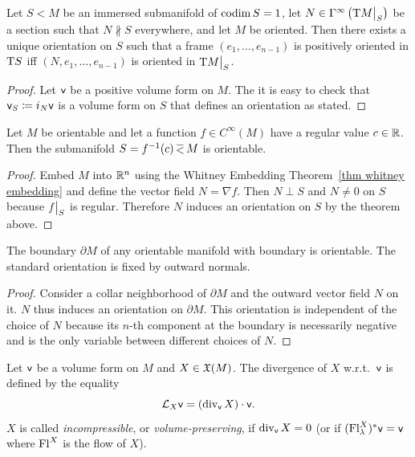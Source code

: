 \begin{thm}\label{thm orientation via normal vector}
    Let $S<M$ be an immersed submanifold of $\operatorname{codim} S=1$, let $N\in\Gamma^\infty\left(\restr{\T M}{S}\right)$ be a section such that $N\not\parallel S$ everywhere, and let $M$ be oriented. Then there exists a unique orientation on $S$ such that a frame $(e_1,\ldots,e_{n-1})$ is positively oriented in $\mathrm{T} S$ iff $(N,e_1,\ldots,e_{n-1})$ is oriented in $\restr{\T M}{S}$.
\end{thm}
\begin{proof}
    Let $\mathsf{v}$ be a positive volume form on $M$. The it is easy to check that $\mathsf{v}_S\coloneqq i_N \mathsf{v}$ is a volume form on $S$ that defines an orientation as stated.
\end{proof}
\begin{cor}
    Let $M$ be orientable and let a function $f\in C^\infty(M)$ have a regular value $c\in \mathbb{R} $. Then the submanifold $S=f^{-1}(c)\emb M$ is orientable.
\end{cor}
\begin{proof}
    Embed $M$ into $\mathbb{R}^n$ using the Whitney Embedding Theorem~\ref{thm whitney embedding} and define the vector field $N=\nabla f$. Then $N\perp S$ and $N\neq 0$ on $S$ because $\restr{f}{S}$ is regular. Therefore $N$ induces an orientation on $S$ by the theorem above.
\end{proof}
\begin{cor}
    The boundary $\partial M$ of any orientable manifold with boundary is orientable. The standard orientation is fixed by outward normals.
\end{cor}
\begin{proof}
    Consider a collar neighborhood of $\partial M$ and the outward vector field $N$ on it. $N$ thus induces an orientation on $\partial M$. This orientation is independent of the choice of $N$ because its $n$-th component at the boundary is necessarily negative and is the only variable between different choices of $N$.
\end{proof}


\begin{defn}
    Let $\mathsf{v}$ be a volume form on $M$ and $X\in \mathfrak{X}(M)$. The divergence of $X$ w.r.t.\ $\mathsf{v}$ is defined by the equality
    \[\mathcal{L}_X\mathsf{v} =(\operatorname{div}_{\mathsf{v}} X)\cdot \mathsf{v}.\]
    $X$ is called \emph{incompressible}, or \emph{volume-preserving}, if $\operatorname{div}_{\mathsf{v}} X=0$ (or if $(\mathrm{Fl}^X_\lambda)^\ast\mathsf{v}=\mathsf{v}$ where $\mathrm{Fl}^X$ is the flow of $X$).
\end{defn}


